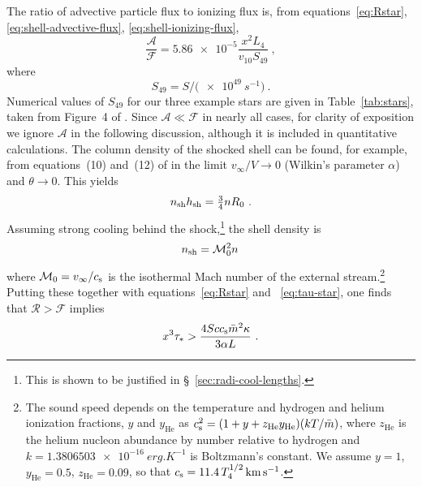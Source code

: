 The ratio of advective particle flux to ionizing flux is, from
equations~\eqref{eq:Rstar}, \eqref{eq:shell-advective-flux},
\eqref{eq:shell-ionizing-flux},
\begin{equation}
  \label{eq:advective-over-ionizing-flux}
  \frac{\mathcal{A}}{\mathcal{F}} = \num{5.86e-5} \frac{x^2 L_4}{v_{10} S_{49}} \ , 
\end{equation}
where
\begin{equation*}
  S_{49} = S / \bigl( \SI{e49}{s^{-1}} \bigr) \ .
\end{equation*}
Numerical values of \(S_{49}\) for our three example stars are given
in Table~\ref{tab:stars}, taken from Figure~4 of
\citet{Sternberg:2003a}.  Since \(\mathcal{A} \ll \mathcal{F}\) in
nearly all cases, for clarity of exposition we ignore \(\mathcal{A}\)
in the following discussion, although it is included in quantitative
calculations.  The column density of the shocked shell can be found,
for example, from equations~(10) and~(12) of \citet{Wilkin:1996a} in
the limit \(v_\infty/V \to 0\) (Wilkin's parameter \(\alpha\)) and
\(\theta \to 0\).  This yields
\begin{equation}
  \label{eq:shocked-shell-column}
  n\shell h\shell = \tfrac34 n R_0 \ .
\end{equation}
Assuming strong cooling behind the shock,\footnote{%
  This is shown to be justified in \S~\ref{sec:radi-cool-lengths}.
} %
the shell density is
\begin{equation}
  \label{eq:isothermal-shell-density}
  n\shell = \mathcal{M}_0^2 n \,
\end{equation}
where
\(\mathcal{M}_0 = v_\infty / \sound\) is the isothermal Mach number of the
external stream.\footnote{%
  \label{fn:temperature-dependence}
  The sound speed depends on the temperature and hydrogen and helium
  ionization fractions, \(y\) and \(y_{\text{He}}\) as
  \(\sound^2 = (1 + y + z_{\text{He}} y_{\text{He}}) (k T /
  \bar{m})\), where \(z_{\text{He}}\) is the helium nucleon abundance
  by number relative to hydrogen and
  \(k = \SI{1.3806503e-16}{erg.K^{-1}}\) is Boltzmann's constant.  We
  assume \(y = 1\), \(y_{\text{He}} = 0.5\), \(z_{\text{He}} = 0.09\),
  so that \(\sound = \num{11.4}\, T_4^{1/2}\, \si{km.s^{-1}}\). } %
Putting these together with equations~\eqref{eq:Rstar} and
~\eqref{eq:tau-star}, one finds that \(\mathcal{R} > \mathcal{F}\)
implies
\begin{equation}
  \label{eq:ifront-trap-x-cubed-taustar}
  x^3 \tau_* > \frac{4 S c \sound \bar{m}^2 \kappa}{3 \alpha L} \ .
\end{equation}
